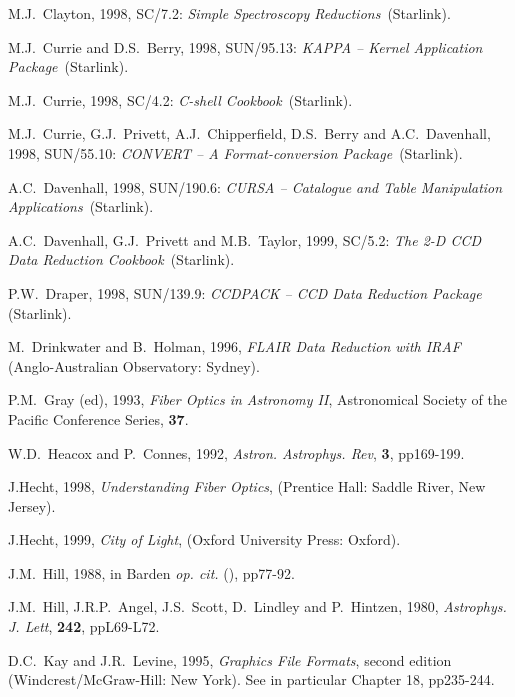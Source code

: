 \documentclass[twoside,11pt]{article}
\newcommand{\htmladdnormallink}[2]{#1}
\newcommand{\xref}[3]{#1}
\begin{document}
\begin{thebibliography}{99}
   M.J.~Clayton, 1998, \xref{SC/7.2}{sc7}{}: {\it Simple
   Spectroscopy Reductions}\, (Starlink).

   M.J.~Currie and D.S.~Berry, 1998, \xref{SUN/95.13}{sun95}{}:
   {\it KAPPA -- Kernel Application Package}\, (Starlink).

   M.J.~Currie, 1998, \xref{SC/4.2}{sc4}{}: {\it C-shell
   Cookbook}\, (Starlink).

   M.J.~Currie, G.J.~Privett, A.J.~Chipperfield,
   D.S.~Berry and A.C.~Davenhall, 1998, \xref{SUN/55.10}{sun55}{}:
   {\it CONVERT -- A Format-conversion Package}\, (Starlink).

   A.C.~Davenhall, 1998, \xref{SUN/190.6}{sun190}{}: 
   {\it CURSA -- Catalogue and Table Manipulation Applications}\, (Starlink).

   A.C.~Davenhall, G.J.~Privett and M.B.~Taylor, 1999,
   \xref{SC/5.2}{sc5}{}: {\it The 2-D CCD Data Reduction Cookbook}\,
   (Starlink).

   P.W.~Draper, 1998, \xref{SUN/139.9}{sun139}{}: {\it
   CCDPACK -- CCD Data Reduction Package}\, (Starlink).

   M.~Drinkwater and B.~Holman, 1996, {\it FLAIR Data
   Reduction with IRAF}\, (Anglo-Australian Observatory: Sydney).

   P.M.~Gray (ed), 1993, {\it Fiber Optics in Astronomy
   II}, Astronomical Society of the Pacific Conference Series,
   {\bf 37}.

   W.D.~Heacox and P.~Connes, 1992, {\it Astron.
   Astrophys. Rev}, {\bf 3}, pp169-199.

   J.Hecht, 1998, 
   \htmladdnormallink{{\it Understanding Fiber Optics}}
   {http://www.sff.net/people/jeff.hecht/UFO.html},
   (Prentice Hall: Saddle River, New Jersey).

   J.Hecht, 1999,
   \htmladdnormallink{{\it City of Light}}
   {http://www.sff.net/people/Jeff.Hecht/City.html},
   (Oxford University Press: Oxford).

   J.M.~Hill, 1988, in Barden {\it op. cit.}\/
   (\cite{BARDEN88}), pp77-92.

   J.M.~Hill, J.R.P.~Angel, J.S.~Scott, D.~Lindley and
   P.~Hintzen, 1980, {\it  Astrophys. J. Lett}, {\bf 242}, ppL69-L72.

   D.C.~Kay and J.R.~Levine, 1995, {\it Graphics File
   Formats}, second edition
  \newline (Windcrest/McGraw-Hill: New York).  See in particular
   Chapter 18, pp235-244.


\end{thebibliography}
\end{document}
